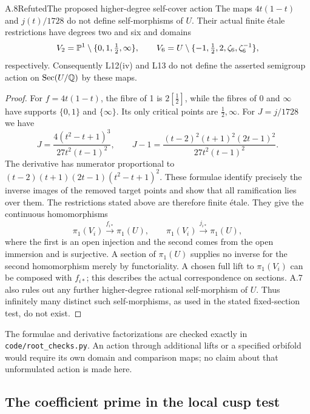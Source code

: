\begin{statement}{A.8}{Refuted}{The proposed higher-degree self-cover action}
The maps $4t(1-t)$ and $j(t)/1728$ do not define self-morphisms of
$U$. Their actual finite \'etale restrictions have degrees two
and six and domains
\[
 V_2=\mathbb P^1\setminus\{0,1,\tfrac12,\infty\},
 \qquad
 V_6=U\setminus\{-1,\tfrac12,2,\zeta_6,\zeta_6^{-1}\},
\]
respectively. Consequently L12(iv) and L13 do not define the
asserted semigroup action on $\operatorname{Sec}(U/\mathbb Q)$ by these maps.
\end{statement}
\begin{proof}
For $f=4t(1-t)$, the fibre of 1 is $2[\tfrac12]$, while the
fibres of 0 and $\infty$ have supports $\{0,1\}$ and $\{\infty\}$.
Its only critical points are $\tfrac12,\infty$.
For $J=j/1728$ we have
\[
 J=\frac{4(t^2-t+1)^3}{27t^2(t-1)^2},\qquad
 J-1=\frac{(t-2)^2(t+1)^2(2t-1)^2}{27t^2(t-1)^2}.
\]
The derivative has numerator proportional to
$(t-2)(t+1)(2t-1)(t^2-t+1)^2$.
These formulae identify precisely the inverse images of the removed
target points and show that all ramification lies over them.
The restrictions stated above are therefore finite \'etale.
They give the continuous homomorphisms
\[
 \pi_1(V_i)\xrightarrow{f_{i*}}\pi_1(U),
 \qquad
 \pi_1(V_i)\xrightarrow{j_{i*}}\pi_1(U),
\]
where the first is an open injection and the second comes from the
open immersion and is surjective. A section of $\pi_1(U)$ supplies
no inverse for the second homomorphism merely by functoriality.
A chosen full lift to $\pi_1(V_i)$ can be composed with $f_{i*}$;
this describes the actual correspondence on sections.
A.7 also rules out any further higher-degree rational self-morphism
of $U$. Thus infinitely many distinct such self-morphisms, as used
in the stated fixed-section test, do not exist.
\end{proof}
The formulae and derivative factorizations are checked exactly in
\texttt{code/root\_checks.py}. An action through additional lifts
or a specified orbifold would require its own domain and comparison
maps; no claim about that unformulated action is made here.

\subsection{The coefficient prime in the local cusp test}

